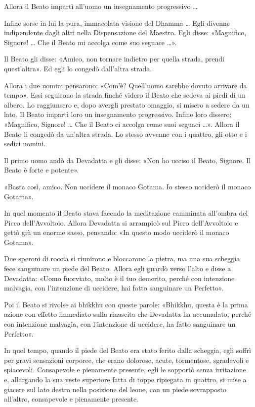 Allora il Beato impartì all’uomo un insegnamento progressivo …

Infine sorse in lui la pura, immacolata visione del Dhamma … Egli divenne
indipendente dagli altri nella Dispensazione del Maestro. Egli disse:
«Magnifico, Signore! … Che il Beato mi accolga come suo seguace …».

Il Beato gli disse: «Amico, non tornare indietro per quella strada, prendi
quest’altra». Ed egli lo congedò dall’altra strada.

Allora i due uomini pensarono: «Com’è? Quell’uomo sarebbe dovuto arrivare da
tempo». Essi seguirono la strada finché videro il Beato che sedeva ai piedi di
un albero. Lo raggiunsero e, dopo avergli prestato omaggio, si misero a sedere
da un lato. Il Beato impartì loro un insegnamento progressivo. Infine loro
dissero: «Magnifico, Signore! … Che il Beato ci accolga come suoi seguaci …».
Allora il Beato li congedò da un’altra strada. Lo stesso avvenne con i quattro,
gli otto e i sedici uomini.

Il primo uomo andò da Devadatta e gli disse: «Non ho ucciso il Beato, Signore.
Il Beato è forte e potente».

«Basta così, amico. Non uccidere il monaco Gotama. Io stesso ucciderò il monaco
Gotama».

In quel momento il Beato stava facendo la meditazione camminata all’ombra del
Picco dell’Avvoltoio. Allora Devadatta si arrampicò sul Picco dell’Avvoltoio e
gettò giù un enorme sasso, pensando: «In questo modo ucciderò il monaco Gotama».

Due speroni di roccia si riunirono e bloccarono la pietra, ma una sua scheggia
fece sanguinare un piede del Beato. Allora egli guardò verso l’alto e disse a
Devadatta: «Uomo fuorviato, molto è il tuo demerito, perché con intenzione
malvagia, con l’intenzione di uccidere, hai fatto sanguinare un Perfetto».

Poi il Beato si rivolse ai bhikkhu con queste parole: «Bhikkhu, questa è la
prima azione con effetto immediato sulla rinascita che Devadatta ha accumulato,
perché con intenzione malvagia, con l’intenzione di uccidere, ha fatto
sanguinare un Perfetto».


 In quel tempo, quando il piede del Beato era stato ferito
dalla scheggia, egli soffrì per gravi sensazioni corporee, che erano dolorose,
acute, tormentose, sgradevoli e spiacevoli. Consapevole e pienamente presente,
egli le sopportò senza irritazione e, allargando la sua veste superiore fatta di
toppe ripiegata in quattro, si mise a giacere sul lato destro nella posizione
del leone, con un piede sovrapposto all’altro, consapevole e pienamente
presente.

